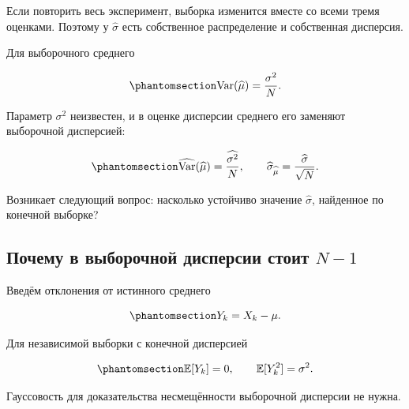 \documentclass[
  russian,
  11pt,
  a4paper,
  open=any]{scrbook}
\begin{document}
Если повторить весь эксперимент, выборка изменится вместе со всеми тремя
оценками. Поэтому у \(\widehat\sigma\) есть собственное распределение и
собственная дисперсия.

Для выборочного среднего

\begin{equation}\protect\phantomsection\label{eq-ch6-sample-mean-variance}{
\operatorname{Var}(\widehat\mu)=\frac{\sigma^2}{N}.
}\end{equation}

Параметр \(\sigma^2\) неизвестен, и в оценке дисперсии среднего его
заменяют выборочной дисперсией:

\begin{equation}\protect\phantomsection\label{eq-ch6-estimated-mean-uncertainty}{
\widehat{\operatorname{Var}}(\widehat\mu)
=\frac{\widehat{\sigma^2}}{N},
\qquad
\widehat\sigma_{\widehat\mu}
=\frac{\widehat\sigma}{\sqrt N}.
}\end{equation}

Возникает следующий вопрос: насколько устойчиво значение
\(\widehat\sigma\), найденное по конечной выборке?

\subsection{\texorpdfstring{Почему в выборочной дисперсии стоит
\(N-1\)}{Почему в выборочной дисперсии стоит N-1}}\label{ux43fux43eux447ux435ux43cux443-ux432-ux432ux44bux431ux43eux440ux43eux447ux43dux43eux439-ux434ux438ux441ux43fux435ux440ux441ux438ux438-ux441ux442ux43eux438ux442-n-1}

Введём отклонения от истинного среднего

\begin{equation}\protect\phantomsection\label{eq-ch6-centered-observations}{
Y_k=X_k-\mu.
}\end{equation}

Для независимой выборки с конечной дисперсией

\begin{equation}\protect\phantomsection\label{eq-ch6-centered-first-two-moments}{
\mathbb E[Y_k]=0,
\qquad
\mathbb E[Y_k^2]=\sigma^2.
}\end{equation}

Гауссовость для доказательства несмещённости выборочной дисперсии не
нужна.
\end{document}
